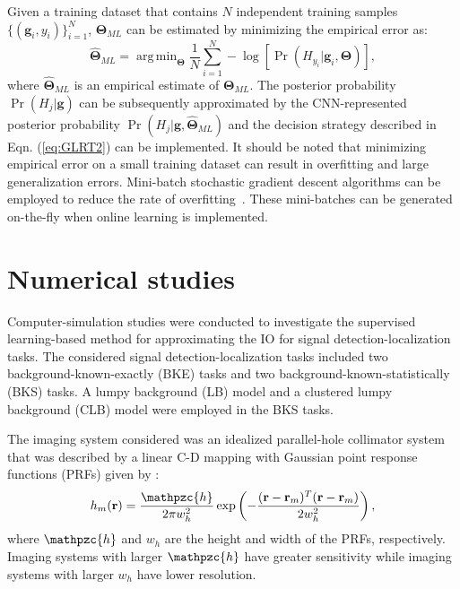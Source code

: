 \documentclass[journal]{IEEEtran}
\renewcommand{\vec}[1]{\mathbf{#1}}
\DeclareMathOperator*{\argmin}{arg\,min}
\begin{document}
Given a training dataset that contains $N$
 independent training samples $\{ (\vec{g}_i, y_i) \}_{i=1}^{N}$,
$\bm\Theta_{ML}$ can be estimated by minimizing the empirical error as:
\begin{equation}\label{eq:loss}
\hat{\bm\Theta}_{ML} = \argmin_{\bm\Theta} \frac{1}{N}\sum_{i=1}^{N}-\log[\Pr({H_{y_i}}|\vec{g}_i, \bm\Theta)],
\end{equation}  
where $\hat{\bm\Theta}_{ML}$ is an empirical estimate of $\bm\Theta_{ML}$.
The posterior probability $\Pr(H_j|\vec{g})$ can be subsequently approximated by the CNN-represented posterior probability $\Pr(H_j | \vec{g}, \hat{\bm\Theta}_{ML})$
and the decision strategy described in Eqn. (\ref{eq:GLRT2}) can be implemented.
It should be noted that minimizing empirical error on a small training dataset can result in overfitting and large generalization errors. 
Mini-batch stochastic gradient descent algorithms can be employed to reduce the rate of overfitting~\cite{goodfellow2016deep}. 
These mini-batches can be generated on-the-fly when online learning is implemented.

\vspace{0.8cm}
\section{Numerical studies}
\label{sec:studies}
Computer-simulation studies were conducted to investigate the supervised learning-based method for approximating the IO for 
signal detection-localization tasks. The considered signal detection-localization tasks
 included two background-known-exactly (BKE) tasks and two
background-known-statistically (BKS) tasks.
A lumpy background (LB) model \cite{kupinski2005small} and a clustered lumpy background (CLB) model \cite{bochud1999statistical} were employed in the BKS tasks. 

The imaging system considered was an idealized parallel-hole collimator system that
 was described  by a linear C-D mapping with  
Gaussian point response functions (PRFs) given by \cite{kupinski2003ideal, kupinski2003experimental}:
\begin{equation}
h_m(\vec{r}) = \frac{\mathpzc{h}}{2\pi w_h^2}\exp\left(-\frac{(\vec{r}-\vec{r}_m)^T(\vec{r}-\vec{r}_m)}{2w_h^2}  \right),
\end{equation}
where $\mathpzc{h}$ and $w_h$ are the height and width of the PRFs, respectively.
{Imaging systems with larger $\mathpzc{h}$ have greater sensitivity while imaging systems with larger $w_h$ have lower resolution.}
\end{document}
